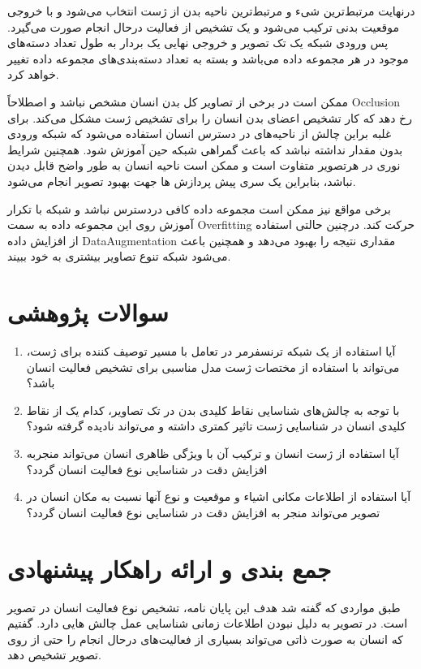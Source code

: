 درنهایت مرتبط‌ترین شیء و مرتبط‌ترین ناحیه بدن از ژست انتخاب می‌شود و با خروجی موقعیت بدنی ترکیب می‌شود و یک تشخیص از فعالیت درحال انجام صورت می‌گیرد. پس ورودی شبکه یک تک تصویر و خروجی نهایی یک بردار به طول تعداد دسته‌های موجود در هر مجموعه ‌داده می‌باشد و بسته به تعداد دسته‌بندی‌های مجموعه داده تغییر خواهد کرد. 

ممکن است در برخی از تصاویر کل بدن انسان مشخص نباشد و اصطلاحاً %
\gls{Occlusion}
 رخ دهد که کار تشخیص اعضای بدن انسان را برای تشخیص ژست مشکل می‌کند. برای غلبه براین چالش از ناحیه‌های در دسترس انسان استفاده می‌شود که شبکه ورودی بدون مقدار نداشته نباشد که باعث گمراهی شبکه حین آموزش شود. همچنین شرایط نوری در هرتصویر متفاوت است و ممکن است ناحیه انسان به طور واضح قابل دیدن نباشد، بنابراین یک سری پیش پردازش ها جهت بهبود تصویر انجام می‌شود.

برخی مواقع نیز ممکن است مجموعه داده کافی دردسترس نباشد و شبکه با تکرار آموزش روی این مجموعه داده به سمت %
\gls{Overfitting}
 حرکت کند. درچنین حالتی استفاده از افزایش داده%
 \gls{DataAugmentation}
  مقداری نتیجه را بهبود می‌دهد و همچنین باعث می‌شود شبکه تنوع تصاویر بیشتری به خود ببیند.
\section{سوالات پژوهشی} 
\begin{enumerate}
	\item 
	آیا استفاده از یک شبکه ترنسفرمر در تعامل با مسیر توصیف کننده برای ژست، می‌تواند با استفاده از مختصات ژست مدل مناسبی برای تشخیص فعالیت انسان باشد؟
	\item
	با توجه به چالش‌های شناسایی نقاط کلیدی بدن در تک تصاویر، کدام یک از نقاط کلیدی انسان در شناسایی ژست تاثیر کمتری داشته و می‌‌تواند نادیده گرفته شود؟
	\item
	آیا استفاده از ژست انسان و ترکیب آن با ویژگی ظاهری انسان می‌تواند منجربه افزایش دقت در شناسایی نوع فعالیت انسان گردد؟
	\item
	آیا استفاده از اطلاعات مکانی اشیاء و موقعیت و نوع آنها نسبت به مکان انسان در تصویر می‌تواند منجر به افزایش دقت در شناسایی نوع فعالیت انسان گردد؟
\end{enumerate}
\section{جمع بندی و ارائه راهکار پیشنهادی} 

طبق مواردی که گفته شد هدف این پایان نامه، تشخیص نوع فعالیت انسان در تصویر است. در تصویر به دلیل نبودن اطلاعات زمانی شناسایی عمل چالش هایی دارد. گفتیم که انسان به صورت ذاتی می‌تواند بسیاری از فعالیت‌های درحال انجام را حتی از روی تصویر تشخیص دهد.

